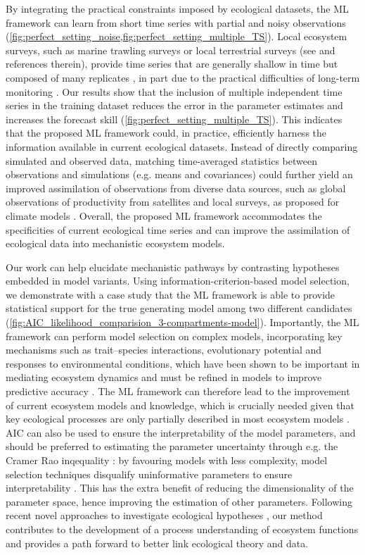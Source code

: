By integrating the practical constraints imposed by ecological datasets, the ML framework can learn from short time series with partial and noisy observations (\cref{fig:perfect_setting_noise,fig:perfect_setting_multiple_TS}). 
% 
Local ecosystem surveys, such as marine trawling surveys or local terrestrial surveys (see \cite{Pinsky2013,Dornelas2018,Burrows2019} and references therein), provide time series that are generally shallow in time but composed of many replicates \citep{Hsieh2008,Clark2015}, in part due to the practical difficulties of long-term monitoring \citep{Ye2016}. 
% 
Our results show that the inclusion of multiple independent time series in the training dataset reduces the error in the parameter estimates and increases the forecast skill (\cref{fig:perfect_setting_multiple_TS}). This indicates that the proposed ML framework could, in practice, efficiently harness the information available in current ecological datasets.
% 
Instead of directly comparing simulated and observed data, matching time-averaged statistics between observations and simulations (e.g. means and covariances) could further yield an improved assimilation of observations from diverse data sources, such as global observations of productivity from satellites and local surveys, as proposed for climate models \citep{Schneider2017}.
% 
Overall, the proposed ML framework accommodates the specificities of current ecological time series and can improve the assimilation of ecological data into mechanistic ecosystem models.

Our work can help elucidate mechanistic pathways by contrasting hypotheses embedded in model variants.
%
Using information-criterion-based model selection, we demonstrate with a case study that the ML framework is able to provide statistical support for the true generating model among two different candidates (\cref{fig:AIC_likelihood_comparision_3-compartments-model}).
% 
Importantly, the ML framework can perform model selection on complex models, incorporating key mechanisms such as trait--species interactions, evolutionary potential and responses to environmental conditions, which have been shown to be important in mediating ecosystem dynamics and must be refined in models to improve predictive accuracy \citep{Urban2016}.
% 
The ML framework can therefore lead to the improvement of current ecosystem models and knowledge, which is crucially needed given that key ecological processes are only partially described in most ecosystem models \citep{Schartau2017}.
% 
AIC can also be used to ensure the interpretability of the model parameters, and should be preferred to estimating the parameter uncertainty through e.g. the Cramer Rao inqequality \citep{Burnham2002}: by favouring models with less complexity, model selection techniques disqualify uninformative parameters to ensure interpretability \citep{Burnham2002}. This has the extra benefit of reducing the dimensionality of the parameter space, hence improving the estimation of other parameters. 
%
Following recent novel approaches to investigate ecological hypotheses \citep{Curtsdotter2019}, our method contributes to the development of a process understanding of ecosystem functions and provides a path forward to better link ecological theory and data.

